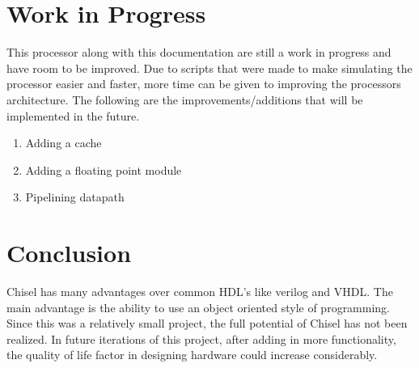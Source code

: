 \documentclass[12pt, letterpaper]{report}
\begin{document}
\section{Work in Progress}
This processor along with this documentation are still a work in progress and have room to be improved.
Due to scripts that were made to make simulating the processor easier and faster, more time can be
given to improving the processors architecture. The following are the improvements/additions that
will be implemented in the future.

\begin{enumerate}
	\item Adding a cache
	\item Adding a floating point module
	\item Pipelining datapath
\end{enumerate}

\section{Conclusion}
Chisel has many advantages over common HDL's like verilog and VHDL. The main advantage is the ability to use an object oriented style of programming. Since this was a relatively small project, the full potential of Chisel has not been realized. In future iterations of this project, after adding in more functionality, the quality of life factor in designing hardware could increase considerably.
\end{document}
